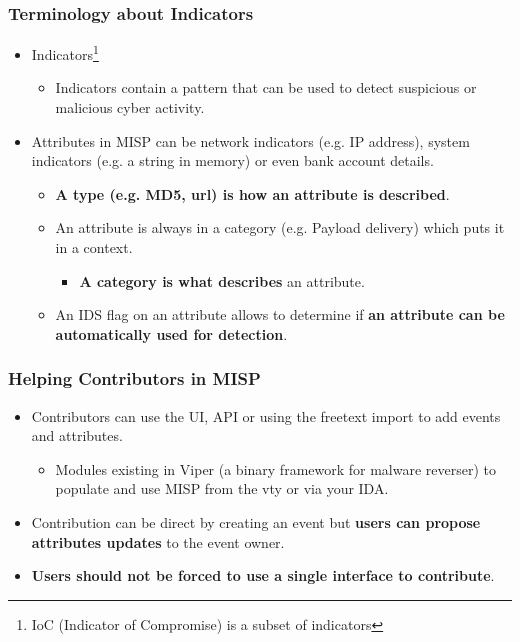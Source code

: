 \begin{frame}
        \frametitle{Terminology about Indicators}
        \begin{itemize}
                \item Indicators\footnote{IoC (Indicator of Compromise) is a subset of indicators}
                        \begin{itemize}
                                \item Indicators contain a pattern that can be used to detect suspicious or malicious cyber activity.
                        \end{itemize}
                \item Attributes in MISP can be network indicators (e.g. IP address), system indicators (e.g. a string in memory) or even bank account details.
                \begin{itemize}
                        \item {\bf A type (e.g. MD5, url) is how an attribute is described}.
                \end{itemize}
                \begin{itemize}
                \item An attribute is always in a category (e.g. Payload delivery) which puts it in a context.
                        \begin{itemize}
                                \item {\bf A category is what describes} an attribute.
                        \end{itemize}
                \item An IDS flag on an attribute allows to determine if {\bf an attribute can be automatically used for detection}.
                \end{itemize}
        \end{itemize}
\end{frame}

\begin{frame}
        \frametitle{Helping Contributors in MISP}
        \begin{itemize}
            \item Contributors can use the UI, API or using the freetext import to add events and attributes.
                \begin{itemize}
                        \item Modules existing in Viper (a binary framework for malware reverser) to populate and use MISP from the vty or via your IDA.
                \end{itemize}
        \item Contribution can be direct by creating an event but {\bf users can propose attributes updates} to the event owner.
            \item {\bf Users should not be forced to use a single interface to contribute}.
        \end{itemize}
\end{frame}

